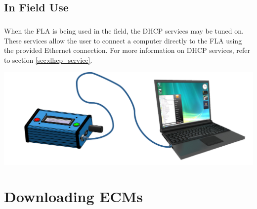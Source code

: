 \documentclass[11pt, oneside]{book}
\begin{document}
\section{In Field Use}\label{setting_fla_in_field}
\paragraph{  }
When the FLA is being used in the field, the DHCP services may be tuned on. These services allow the user to connect a computer directly to the FLA using the provided Ethernet connection. For more information on DHCP services, refer to section \ref{sec:dhcp_service}.
\begin{center}
\includegraphics[width=.9\linewidth]{../media/graphics/fla_in_field}
\end{center}
\chapter{Downloading ECMs}
\end{document}
